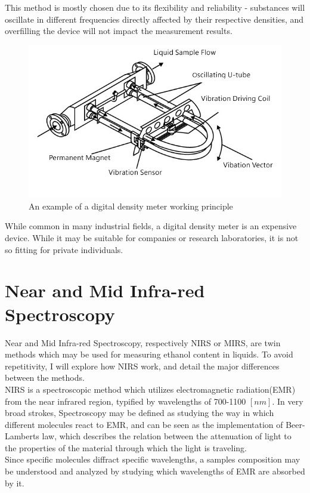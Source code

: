 \documentclass[twoside]{ctuthesis}
\theoremstyle{plain}
\theoremstyle{definition}
\theoremstyle{note}
\begin{document}
This method is mostly chosen due to its flexibility and reliability - substances will oscillate in different frequencies directly affected by their respective densities, and overfilling the device will not impact the measurement results\cite{Density_Measurement}.
\begin{figure}[H]
	\centering
	\includegraphics[scale = 0.45]{u-tube-density-meter}
	\caption{An example of a digital density meter working principle}
\end{figure}

While common in many industrial fields, a digital density meter is an expensive device. While it may be suitable for companies or research laboratories, it is not so fitting for private individuals.

\section{Near and Mid Infra-red Spectroscopy}
Near and Mid Infra-red Spectroscopy, respectively NIRS or MIRS, are twin methods which may be used for measuring ethanol content in liquids. To avoid repetitivity, I will explore how NIRS work, and detail the major differences between the methods.\\
NIRS is a spectroscopic method which utilizes electromagnetic radiation(EMR) from the near infrared region, typified by wavelengths of 700-1100 $[nm]$\cite{NIR_Spectroscopy_Ethanol}. In very broad strokes, Spectroscopy may be defined as studying the way in which different molecules react to EMR, and can be seen as the implementation of Beer-Lamberts law, which describes the relation between the attenuation of light to the properties of the material through which the light is traveling.\\
Since specific molecules diffract specific wavelengths, a samples composition may be understood and analyzed by studying which wavelengths of EMR are absorbed by it.
\end{document}
